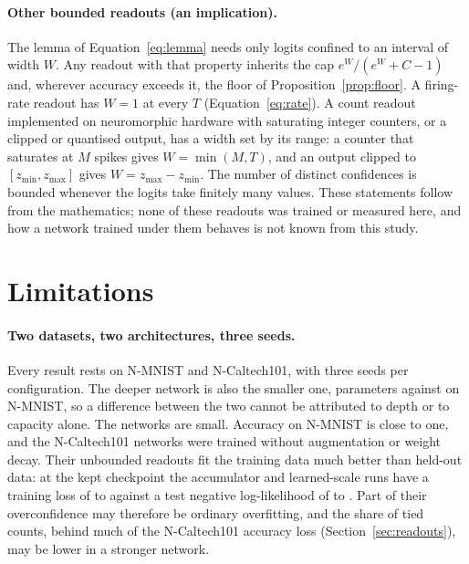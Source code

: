 \documentclass[10pt]{article}
\begin{document}
\paragraph{Other bounded readouts (an implication).} The lemma of
Equation~\eqref{eq:lemma} needs only logits confined to an interval of width $W$. Any readout with
that property inherits the cap $e^{W}/(e^{W}+C-1)$ and, wherever accuracy exceeds it, the floor of
Proposition~\ref{prop:floor}. A firing-rate readout has $W=1$ at every $T$
(Equation~\eqref{eq:rate}). A count readout implemented on neuromorphic hardware with saturating
integer counters, or a clipped or quantised output, has a width set by its range: a counter that
saturates at $M$ spikes gives $W=\min(M,T)$, and an output clipped to $[z_{\min},z_{\max}]$ gives
$W=z_{\max}-z_{\min}$. The number of distinct confidences is bounded whenever the logits take
finitely many values. These statements follow from the mathematics; none of these readouts was
trained or measured here, and how a network trained under them behaves is not known from this
study.

\section{Limitations}
\label{sec:limitations}

\paragraph{Two datasets, two architectures, three seeds.} Every result rests on N-MNIST and
N-Caltech101, with three seeds per configuration. The deeper network is also the smaller one,
\paramsNmFour{} parameters against \paramsNmTwo{} on N-MNIST, so a difference between the two %
cannot be attributed to depth or to capacity alone. The networks are small. Accuracy on N-MNIST
is close to one, and the N-Caltech101 networks were trained without augmentation or weight decay.
Their unbounded readouts fit the training data much better than held-out data: at the kept
checkpoint the accumulator and learned-scale runs have a training loss of %
\ovTrainLossMin{} to \ovTrainLossMax{} against a test negative log-likelihood of \ovNllMin{} to
\ovNllMax. Part of their overconfidence may therefore be ordinary overfitting, and the share of
tied counts, behind much of the N-Caltech101 accuracy loss (Section~\ref{sec:readouts}), may be lower in a
stronger network.
\end{document}
